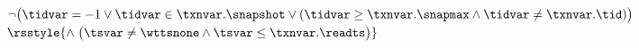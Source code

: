 
\begin{algorithm}[H]
  \begin{algorithmic}[1]
    \Procedure{\txnvis}{$\txnvar, \tidvar, \rsstyle{\tsvar}$}
      \State \Return
          $\lnot \big(\tidvar = -1
          \lor \tidvar \in \txnvar.\snapshot
          \lor (\tidvar \ge \txnvar.\snapmax \land \tidvar \neq \txnvar.\tid)\big)$
          $\rsstyle{\land\; \big(\tsvar \neq \wttsnone \land \tsvar \le \txnvar.\readts\big)}$
    \EndProcedure
  \end{algorithmic}
\end{algorithm}